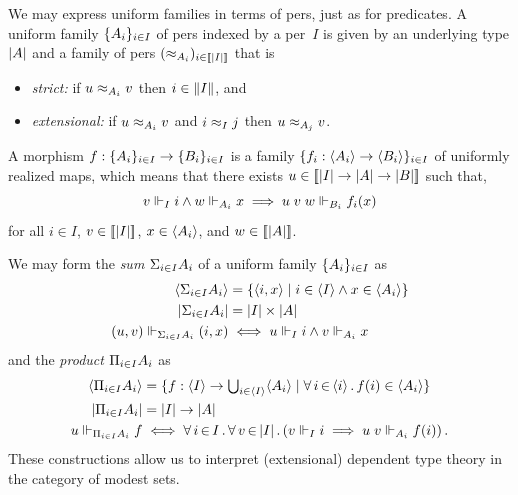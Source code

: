 We may express uniform families in terms of pers, just as for
predicates. A uniform family $\{A_i\}_{i \in I}$ of pers indexed
by a per~$I$ is given by an underlying type $|A|$ and a family
of pers $(\approx_{A_i})_{i \in [\![|I|]\!]}$ that is
% 
\begin{itemize}
\item \emph{strict:} if $u \approx_{A_i} v$ then $i \in \|I\|$, and
\item \emph{extensional:} if $u \approx_{A_i} v$ and $i \approx_I j$ then $u
  \approx_{A_j} v$.
\end{itemize}
%
A morphism $f : \{A_i\}_{i \in I} \to \{B_i\}_{i \in I}$ is a
family $\{f_i : \langle A_i \rangle \to \langle B_i \rangle\}_{i \in I}$ of
uniformly realized maps, which means that there exists $u \in
[\![|I| \to |A| \to |B|]\!]$ such that,
%
\begin{equation*}
  v \Vdash_I i \land w \Vdash_{A_i} x \implies u\; v \; w \Vdash_{B_i} f_i(x)
\end{equation*}
%
for all $i \in I$, $v \in [\![|I|]\!]$, $x \in \langle A_i \rangle$,
and $w \in [\![|A|]\!]$.

We may form the \emph{sum} ${\Sigma_{i \in I} A_i}$ of a uniform family
$\{A_i\}_{i \in I}$ as
%
\begin{align*}
  \langle {\Sigma_{i \in I} A_i} \rangle &=
  \{\langle i,x \rangle \mid i \in \langle I \rangle \land x \in \langle A_i \rangle\}
  \\
  |{\Sigma_{i \in I} A_i}| &=
  |I| \times |A|
  \\
  (u,v) \Vdash_{{\Sigma_{i \in I} A_i}} (i,x)
  &\iff
  u \Vdash_I i \land v \Vdash_{A_i} x
\end{align*}
%
and the \emph{product} ${\Pi_{i \in I} A_i}$ as
%
\begin{align*}
  \langle {\Pi_{i \in I} A_i} \rangle &=
  \{f : \langle I \rangle \to {\textstyle \bigcup_{i \in \langle I \rangle} \langle A_i \rangle} \mid
    \forall\, i \,{\in}\, \langle i \rangle\,.\,f(i) \in \langle A_i \rangle\}
  \\
  |{\Pi_{i \in I} A_i}| &=
  |I| \to |A|
  \\
  u \Vdash_{{\Pi_{i \in I} A_i}} f
  &\iff
  \forall\, i \,{\in}\, I\,.\,\forall\, v \,{\in}\, |I|\,.\left(
      v \Vdash_I i \implies
      u \; v \Vdash_{A_i} f(i)
    \right).
\end{align*}
%
These constructions allow us to interpret (extensional) dependent type
theory in the category of modest sets.

